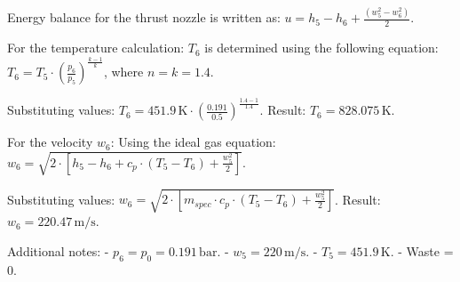 Energy balance for the thrust nozzle is written as:  
\( u = h_5 - h_6 + \frac{(w_5^2 - w_6^2)}{2} \).  

For the temperature calculation:  
\( T_6 \) is determined using the following equation:  
\( T_6 = T_5 \cdot \left( \frac{p_6}{p_5} \right)^{\frac{k-1}{k}} \),  
where \( n = k = 1.4 \).  

Substituting values:  
\( T_6 = 451.9 \, \text{K} \cdot \left( \frac{0.191}{0.5} \right)^{\frac{1.4-1}{1.4}} \).  
Result: \( T_6 = 828.075 \, \text{K} \).  

For the velocity \( w_6 \):  
Using the ideal gas equation:  
\( w_6 = \sqrt{2 \cdot \left[ h_5 - h_6 + c_p \cdot (T_5 - T_6) + \frac{w_5^2}{2} \right]} \).  

Substituting values:  
\( w_6 = \sqrt{2 \cdot \left[ m_{spec} \cdot c_p \cdot (T_5 - T_6) + \frac{w_5^2}{2} \right]} \).  
Result: \( w_6 = 220.47 \, \text{m/s} \).  

Additional notes:  
- \( p_6 = p_0 = 0.191 \, \text{bar} \).  
- \( w_5 = 220 \, \text{m/s} \).  
- \( T_5 = 451.9 \, \text{K} \).  
- Waste = 0.